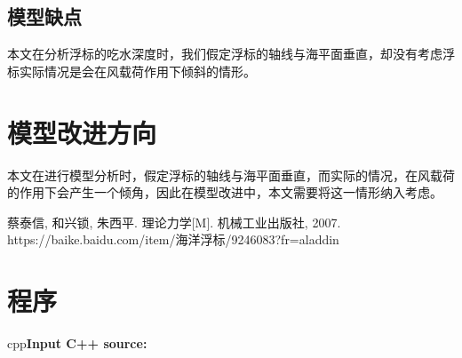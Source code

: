 \documentclass[withoutpreface,bwprint]{cumcmthesis} %
\begin{document}
\subsection{模型缺点}
本文在分析浮标的吃水深度时，我们假定浮标的轴线与海平面垂直，却没有考虑浮标实际情况是会在风载荷作用下倾斜的情形。
\section{模型改进方向}
\par 本文在进行模型分析时，假定浮标的轴线与海平面垂直，而实际的情况，在风载荷的作用下会产生一个倾角，因此在模型改进中，本文需要将这一情形纳入考虑。

\begin{thebibliography}{9}%
  蔡泰信, 和兴锁, 朱西平. 理论力学[M]. 机械工业出版社, 2007.
  https://baike.baidu.com/item/海洋浮标/9246083?fr=aladdin
\end{thebibliography}
\newpage
\appendix
\section{程序}
cpp\textcolor[rgb]{0.98,0.00,0.00}{\textbf{Input C++ source:}}

\end{document}

